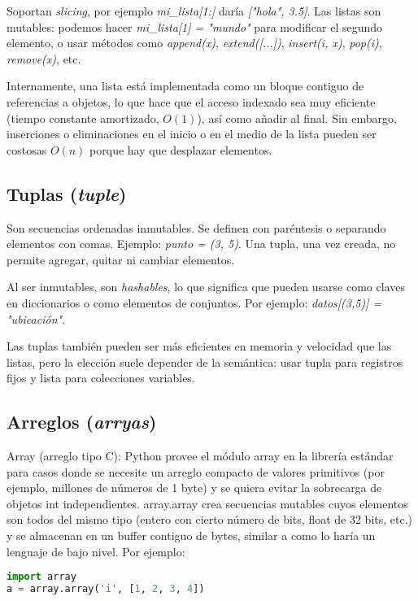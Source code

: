 Soportan \textit{slicing}, por ejemplo \textit{mi\_lista[1:]} daría \textit{["hola", 3.5]}.  
Las listas son mutables: podemos hacer \textit{mi\_lista[1] = "mundo"} para modificar el segundo elemento, 
o usar métodos como \textit{append(x)}, \textit{extend([...])}, \textit{insert(i, x)}, \textit{pop(i)}, 
\textit{remove(x)}, etc.  

Internamente, una lista está implementada como un bloque contiguo de referencias a objetos, 
lo que hace que el acceso indexado sea muy eficiente (tiempo constante amortizado, $O(1)$), 
así como añadir al final. Sin embargo, inserciones o eliminaciones en el inicio o en el medio 
de la lista pueden ser costosas $O(n)$ porque hay que desplazar elementos.  

\subsection*{Tuplas (\textit{tuple})}
Son secuencias ordenadas inmutables. Se definen con paréntesis o separando elementos con comas.  
Ejemplo: \textit{punto = (3, 5)}. Una tupla, una vez creada, no permite agregar, quitar ni 
cambiar elementos.  

Al ser inmutables, son \textit{hashables}, lo que significa que pueden usarse como claves en diccionarios 
o como elementos de conjuntos. Por ejemplo: \textit{datos[(3,5)] = "ubicación"}.  

Las tuplas también pueden ser más eficientes en memoria y velocidad que las listas, 
pero la elección suele depender de la semántica: usar tupla para registros fijos y lista para colecciones variables.  

\subsection*{Arreglos (\textit{arryas})}

Array (arreglo tipo C): Python provee el módulo array en la librería estándar para casos donde se necesite un arreglo compacto de valores primitivos (por ejemplo, millones de números de 1 byte) y se quiera evitar la sobrecarga de objetos int independientes. array.array crea secuencias mutables cuyos elementos son todos del mismo tipo (entero con cierto número de bits, float de 32 bits, etc.) y se almacenan en un buffer contiguo de bytes, similar a como lo haría un lenguaje de bajo nivel. Por ejemplo:

\begin{lstlisting}[language=Python, caption={Definición de Arreglo tipo C en Python.}]
import array
a = array.array('i', [1, 2, 3, 4])
\end{lstlisting}

